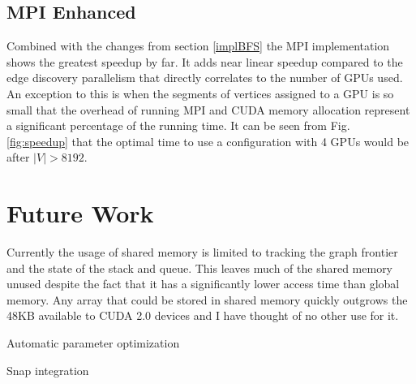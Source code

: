 \documentclass[10pt,twocolumn]{article}
\begin{document}
\subsection{MPI Enhanced}
Combined with the changes from section \ref{implBFS} the MPI implementation shows the greatest speedup by far. It adds near linear speedup compared to the edge discovery parallelism that directly correlates to the number of GPUs used. An exception to this is when the segments of vertices assigned to a GPU is so small that the overhead of running MPI and CUDA memory allocation represent a significant percentage of the running time. It can be seen from Fig. \ref{fig:speedup} that the optimal time to use a configuration with 4 GPUs would be after $|V| > 8192$.

\section{Future Work}
Currently the usage of shared memory is limited to tracking the graph frontier and the state of the stack and queue. This leaves much of the shared memory unused despite the fact that it has a significantly lower access time than global memory. Any array that could be stored in shared memory quickly outgrows the 48KB available to CUDA 2.0 devices and I have thought of no other use for it.

Automatic parameter optimization

Snap integration



\end{document}
